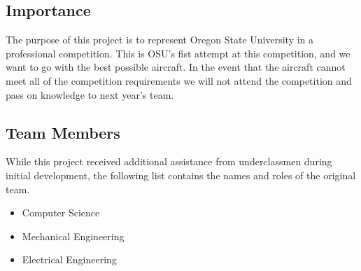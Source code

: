 \documentclass[onecolumn, draftclsnofoot,10pt, compsoc]{IEEEtran}
\begin{document}
\subsection{Importance}

The purpose of this project is to represent Oregon State University in a professional competition. This is OSU's fist attempt at this competition, and we want to go with the best possible aircraft. In the event that the aircraft cannot meet all of the competition requirements we will not attend the competition and pass on knowledge to next year's team.   


\subsection{Team Members}

While this project received additional assistance from underclassmen during initial development, the following list contains the names and roles of the original team.

\begin{itemize}
		\item{Computer Science} 
		
        \item{Mechanical Engineering}
		
        \item{Electrical Engineering} 
		
\end{itemize}     
\end{document}
